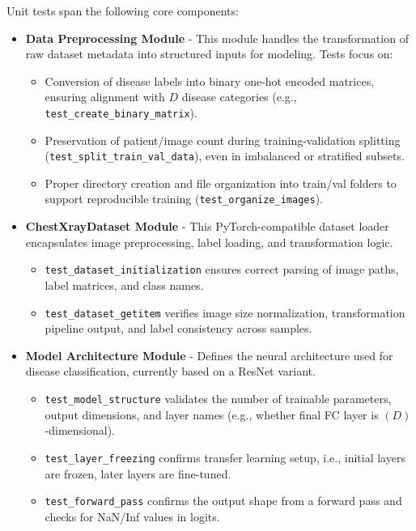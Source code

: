 \documentclass[12pt, titlepage]{article}
\begin{document}
Unit tests span the following core components:

\begin{itemize}
  \item \textbf{Data Preprocessing Module} - This module handles the transformation of raw dataset metadata into structured inputs for modeling. Tests focus on:
    \begin{itemize}
      \item Conversion of disease labels into binary one-hot encoded matrices, ensuring alignment with $D$ disease categories (e.g., \verb|test_create_binary_matrix|).
      \item Preservation of patient/image count during training-validation splitting (\verb|test_split_train_val_data|), even in imbalanced or stratified subsets.
      \item Proper directory creation and file organization into train/val folders to support reproducible training (\verb|test_organize_images|).
    \end{itemize}

  \item \textbf{ChestXrayDataset Module} - This PyTorch-compatible dataset loader encapsulates image preprocessing, label loading, and transformation logic.
    \begin{itemize}
      \item \verb|test_dataset_initialization| ensures correct parsing of image paths, label matrices, and class names.
      \item \verb|test_dataset_getitem| verifies image size normalization, transformation pipeline output, and label consistency across samples.
    \end{itemize}

  \item \textbf{Model Architecture Module} - Defines the neural architecture used for disease classification, currently based on a ResNet variant.
    \begin{itemize}
      \item \verb|test_model_structure| validates the number of trainable parameters, output dimensions, and layer names (e.g., whether final FC layer is $(D)$-dimensional).
      \item \verb|test_layer_freezing| confirms transfer learning setup, i.e., initial layers are frozen, later layers are fine-tuned.
      \item \verb|test_forward_pass| confirms the output shape from a forward pass and checks for NaN/Inf values in logits.
    \end{itemize}


\end{itemize}
\end{document}
